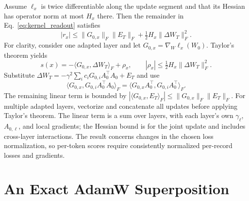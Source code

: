 \documentclass[11pt]{article}
\theoremstyle{plain}
\theoremstyle{definition}
\begin{document}
Assume $\ell_x$ is twice differentiable along the update segment and that its Hessian has operator norm at most $H_x$ there.
Then the remainder in Eq.~\eqref{eq:kernel_readout} satisfies
\begin{equation}
|r_x|\leq\|G_{0,x}\|_F\|E_T\|_F
+\tfrac12H_x\|\Delta W_T\|_F^2.
\label{eq:readout_remainder}
\end{equation}
For clarity, consider one adapted layer and let $G_{0,x}=\nabla_W\ell_x(W_0)$.
Taylor's theorem yields
\[
s(x)=-\langle G_{0,x},\Delta W_T\rangle_F+\rho_x,
\qquad |\rho_x|\leq\tfrac12H_x\|\Delta W_T\|_F^2.
\]
Substitute $\Delta W_T=-\gamma^2\sum_i c_iG_{0,i}A_0^\top A_0+E_T$ and use
\[
\langle G_{0,x},G_{0,i}A_0^\top A_0\rangle_F
=\langle G_{0,x}A_0^\top,G_{0,i}A_0^\top\rangle_F.
\]
The remaining linear term is bounded by
$|\langle G_{0,x},E_T\rangle_F|\leq\|G_{0,x}\|_F\|E_T\|_F$.
For multiple adapted layers, vectorize and concatenate all updates before applying Taylor's theorem.
The linear term is a sum over layers, with each layer's own $\gamma_\ell$, $A_{0,\ell}$, and local gradients; the Hessian bound is for the joint update and includes cross-layer interactions.
The result concerns changes in the chosen loss normalization, so per-token scores require consistently normalized per-record losses and gradients.

\section{An Exact AdamW Superposition}
\label{app:adamw_superposition}
\end{document}
